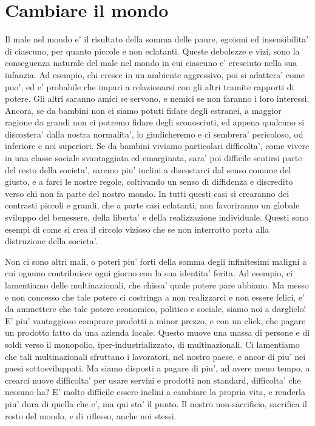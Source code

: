 \chapter{Cambiare il mondo}

Il male nel mondo e' il risultato della somma delle paure, egoismi ed insensibilita' di ciascuno, per quanto piccole e non eclatanti. Queste debolezze e vizi, sono la conseguenza naturale del male nel mondo in cui ciascuno e' cresciuto nella sua infanzia. Ad esempio, chi cresce in un ambiente aggressivo, poi si adattera' come puo', ed e' probabile che impari a relazionarsi con gli altri tramite rapporti di potere. Gli altri saranno amici se servono, e nemici se non faranno i loro interessi. Ancora, se da bambini non ci siamo potuti fidare degli estranei, a maggior ragione da grandi non ci potremo fidare degli sconosciuti, ed appena qualcuno si discostera' dalla nostra normalita', lo giudicheremo e ci sembrera' pericoloso, od inferiore e noi superiori. Se da bambini viviamo particolari difficolta', come vivere in una classe sociale svantaggiata ed emarginata, sara' poi difficile sentirsi parte del resto della societa', saremo piu' inclini a discostarci dal senso comune del giusto, e a farci le nostre regole, coltivando un senso di diffidenza e discredito verso chi non fa parte del nostro mondo. In tutti questi casi si crearanno dei contrasti piccoli e grandi, che a parte casi eclatanti, non favoriranno un globale sviluppo del benessere, della liberta' e della realizzazione individuale. Questi sono esempi di come si crea il circolo vizioso che se non interrotto porta alla distruzione della societa'.

Non ci sono altri mali, o poteri piu' forti della somma degli infinitesimi maligni a cui ognuno contribuisce ogni giorno con la sua identita' ferita. Ad esempio, ci lamentiamo delle multinazionali, che chissa' quale potere pare abbiano. Ma messo e non concesso che tale potere ci costringa a non realizzarci e non essere felici, e' da ammettere che tale potere economico, politico e sociale, siamo noi a darglielo! E' piu' vantaggioso comprare prodotti a minor prezzo, e con un click, che pagare un prodotto fatto da una azienda locale. Questo muove una massa di persone e di soldi verso il monopolio, iper-industrializzato, di multinazionali. Ci lamentiamo che tali multinazionali sfruttano i lavoratori, nel nostro paese, e ancor di piu' nei paesi sottosviluppati. Ma siamo disposti a pagare di piu', ad avere meno tempo, a crearci nuove difficolta' per usare servizi e prodotti non standard, difficolta' che nessuno ha? E' molto difficile essere inclini a cambiare la propria vita, e renderla piu' dura di quella che e', ma qui sta' il punto. Il nostro non-sacrificio, sacrifica il resto del mondo, e di riflesso, anche noi stessi.

